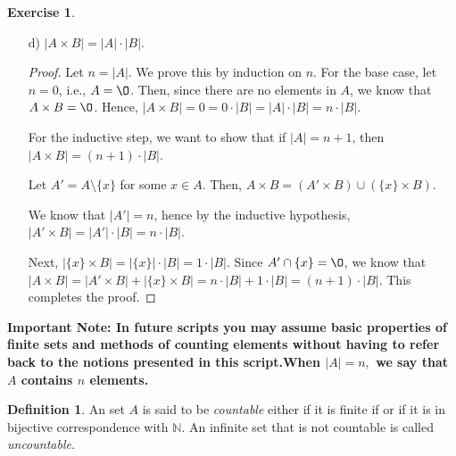 \documentclass[11pt]{article}
\newcommand{\bbN}{\mathbb{N}}
\renewcommand{\emptyset}{\O}
\theoremstyle{definition}
\newtheorem{definition}[theorem]{Definition}
\newtheorem{exercise}[theorem]{Exercise}
\numberwithin{equation}{subsection}
\begin{document}
\begin{exercise}
\begin{enumerate}
\begin{proof}
$A = (A \setminus B) \cup (A \cap B)$. 

$B = (B \setminus A) \cup (A \cap B)$.

Then, the LHS is $|A\cup B|+|A\cap B| = |A\setminus B| + |B \setminus A| + 2\cdot |A\cap B|$.

The RHS is $|A|+|B|=|A\setminus B| + |B \setminus A| + 2\cdot |A\cap B|$. This completes the proof.


\renewcommand\qedsymbol{QED}
\end{proof}
\item[d)]  
 $|A\times B|=|A|\cdot |B|$.
 \begin{proof}
Let $n = |A|$. We prove this by induction on $n$. For the base case, let $n=0$, i.e., $A = \emptyset$. Then, since there are no elements in $A$, we know that $A \times B = \emptyset$. Hence, $|A\times B|=0=0 \cdot |B|=|A|\cdot |B|= n \cdot |B|$.

For the inductive step, we want to show that if $|A|=n+1$, then $|A\times B|=(n+1)\cdot |B|$. 

Let $A' = A \setminus \{x\}$ for some $x \in A$. Then, $A \times B = (A' \times B) \cup (\{x\} \times B)$. 

We know that $|A'|=n$, hence by the inductive hypothesis, $|A' \times B| = |A'| \cdot |B| = n \cdot |B|$. 

Next, $|\{x\} \times B| = |\{x\}| \cdot |B| = 1 \cdot |B|$. Since $A' \cap \{x\} = \emptyset$, we know that $|A \times B| = |A' \times B| + |\{x\} \times B| = n \cdot |B| + 1 \cdot |B| = (n+1) \cdot |B|$. This completes the proof.
 
 
\renewcommand\qedsymbol{QED}
\end{proof}
 \end{enumerate}
\end{exercise}




{\bf Important Note:  In future scripts you may assume basic properties of finite sets and methods of counting elements without having to refer back to the notions presented in this script.When $|A|=n,$ we say that $A$ contains $n$ elements.}

\begin{definition}
An set $A$ is said to be {\em countable} either if it is finite if or if it is in bijective correspondence with $\bbN.$ An infinite set that is not countable is called {\em uncountable}.
\end{definition}
\end{document}
